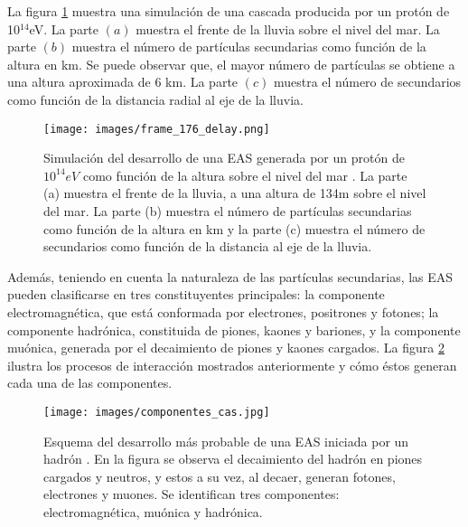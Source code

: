 La figura \ref{fig:fig2} muestra una simulación de una cascada producida por un protón de 10$^{14}$eV. La parte $(a)$ muestra el frente de la lluvia sobre el nivel del mar. La parte $(b)$ muestra el número de partículas secundarias como función de la altura en km. Se puede observar que, el mayor número de partículas se obtiene a una altura aproximada de 6 km. La parte $(c)$ muestra el número de secundarios como función de la distancia radial al eje de la lluvia.\\

\begin{figure}[htb!]
     \begin{center}
        \texttt{[image: images/frame\_176\_delay.png]}
        \end{center}
    \caption[Simulación del desarrollo de una EAS generada por un protón de $10^{14} eV$.]{Simulación del desarrollo de una EAS generada por un protón de $10^{14} eV$ como función de la altura sobre el nivel del mar \cite{kit}. La parte (a) muestra el frente de la lluvia, a una altura de 134m sobre el nivel del mar. La parte (b) muestra el número de partículas secundarias como función de la altura en km y la parte (c) muestra el número de secundarios como función de la distancia al eje de la lluvia.}
    \label{fig:fig2}
\end{figure}
Además, teniendo en cuenta la naturaleza de las partículas secundarias, las EAS pueden clasificarse en tres constituyentes principales: la componente electromagnética, que está conformada por electrones, positrones y fotones; la componente hadrónica, constituida de piones, kaones y bariones, y la componente muónica, generada por el decaimiento de piones y kaones cargados. La figura \ref{fig:fig3} ilustra los procesos de interacción mostrados anteriormente y cómo éstos generan cada una de las componentes.
\begin{figure}[htb!]
    \begin{center}
        \texttt{[image: images/componentes\_cas.jpg]}
    \end{center}{}
    \caption[Esquema del desarrollo de una EAS iniciada por un hadrón.]{Esquema del desarrollo más probable de una EAS iniciada por un hadrón \cite{mauro:tesis}. En la figura se observa el decaimiento del hadrón en piones cargados y neutros, y estos a su vez, al decaer, generan fotones, electrones y muones. Se identifican tres componentes: electromagnética, muónica y hadrónica.}
    \label{fig:fig3}
\end{figure}\\
